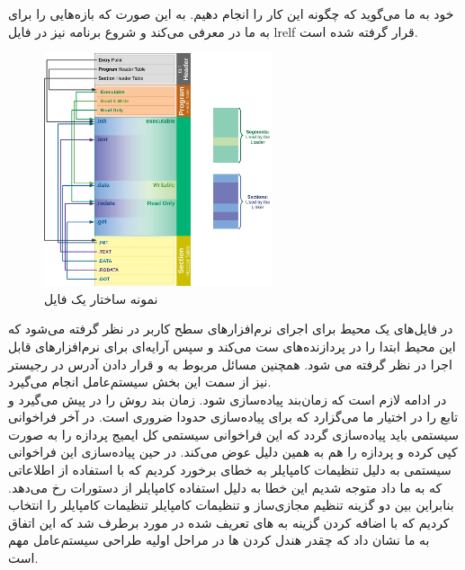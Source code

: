 \documentclass[a4paper, 12pt]{article}
\begin{document}
خود به ما می‌گوید که چگونه این کار را انجام دهیم.
به این صورت که بازه‌هایی را برای
به ما در
معرفی می‌کند و 
شروع برنامه نیز در
فایل
lr{elf}
قرار گرفته شده است.
\begin{figure}[H]
    \centering
    \includegraphics[width=0.6\textwidth]{typical_elf.jpg}
    \caption{
        نمونه ساختار یک فایل
    }
    \label{fig1:output}
\end{figure}
در فایل‌های
یک محیط برای اجرای نرم‌افزار‌های سطح کاربر در نظر گرفته می‌شود که این محیط
ابتدا
را در پردازنده‌های
ست می‌کند و سپس آرایه‌ای برای نرم‌افزار‌های قابل اجرا در نظر گرفته می شود.
همچنین مسائل مربوط به
و قرار دادن آدرس
در رجیستر
نیز از سمت این بخش سیستم‌عامل انجام می‌گیرد. \\
در ادامه لازم است که زمان‌بند پیاده‌سازی شود.
زمان بند روش
را در پیش می‌گیرد و تابع
را در اختیار ما می‌گزارد که برای پیاده‌سازی
حدودا ضروری است.
در آخر فراخوانی سیستمی
باید پیاده‌سازی گردد که این فراخوانی سیستمی
کل ایمیج پردازه را به صورت
کپی کرده و
پردازه را هم به همین دلیل عوض می‌کند.
در حین پیاده‌سازی این فراخوانی سیستمی به دلیل تنظیمات کامپایلر به خطای
برخورد کردیم که با استفاده از اطلاعاتی که 
به ما داد متوجه شدیم این خطا به دلیل استفاده کامپایلر از دستورات
رخ می‌دهد.
بنابراین بین دو گزینه تنظیم مجازی‌ساز
و تنظیمات کامپایلر تنظیمات کامپایلر را انتخاب کردیم که با اضافه کردن گزینه
به
های تعریف شده در
مورد برطرف شد که این اتفاق به ما نشان داد که چقدر هندل کردن
ها در مراحل اولیه طراحی سیستم‌عامل مهم است.
\end{document}
